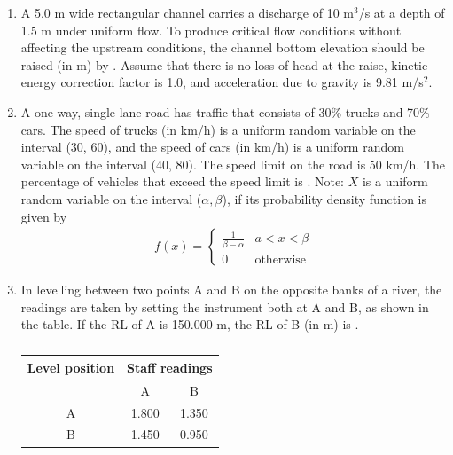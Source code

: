\documentclass[journal,12pt,onecolumn]{article}
\theoremstyle{remark}
\begin{document}
\begin{enumerate}
\hfill{}

\item A 5.0 m wide rectangular channel carries a discharge of 10 m$^3$/s at a depth of 1.5 m under uniform flow. To produce critical flow conditions without affecting the upstream conditions, the channel bottom elevation should be raised (in m) by \underline{\hspace{2cm}} .
Assume that there is no loss of head at the raise, kinetic energy correction factor is 1.0, and acceleration due to gravity is 9.81 m/s$^2$.

\hfill{}

\item A one-way, single lane road has traffic that consists of 30\% trucks and 70\% cars. The speed of trucks (in km/h) is a uniform random variable on the interval (30, 60), and the speed of cars (in km/h) is a uniform random variable on the interval (40, 80). The speed limit on the road is 50 km/h. The percentage of vehicles that exceed the speed limit is \underline{\hspace{2cm}} .
Note: $X$ is a uniform random variable on the interval ($\alpha, \beta$), if its probability density function is given by
\begin{align} 
f(x) = 
\begin{cases} 
\frac{1}{\beta - \alpha} & a < x < \beta \\
0 & \text{otherwise}
\end{cases}
\end{align}

\hfill{}

\item In levelling between two points A and B on the opposite banks of a river, the readings are taken by setting the instrument both at A and B, as shown in the table. If the RL of A is 150.000 m, the RL of B (in m) is \underline{\hspace{2cm}} .
\begin{table}[H]
    \centering
    \begin{tabular}{|c|c|c|}
        \hline
        \textbf{Level position} & \multicolumn{2}{c|}{\textbf{Staff readings}} \\
        \hline
         & A & B \\
        \hline
        A & 1.800 & 1.350 \\
        \hline
        B & 1.450 & 0.950 \\
        \hline
    \end{tabular}
    \caption{}
    \label{tab:q64}
\end{table}


\end{enumerate}
\end{document}

